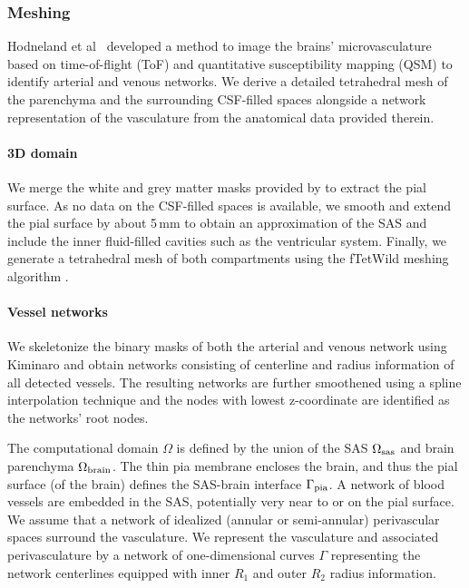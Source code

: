 \documentclass[fleqn,10pt]{wlscirep}
\begin{document}
\subsubsection*{Meshing}

Hodneland et al~\cite{hodneland2019new} developed a method to image the brains' microvasculature based on time-of-flight (ToF) and quantitative susceptibility mapping (QSM) to identify arterial and venous networks.
We derive a detailed tetrahedral mesh of the parenchyma and the surrounding CSF-filled spaces alongside a network representation of the vasculature from the anatomical data provided therein.  

\paragraph{3D domain}

We merge the white and grey matter masks provided by \cite{hodneland2019new} to extract the pial surface. As no data on the CSF-filled spaces is available, we smooth and extend the pial surface by about 5\,mm to obtain an approximation of the SAS and include the inner fluid-filled cavities such as the ventricular system. 
Finally, we generate a tetrahedral mesh of both compartments using the fTetWild meshing algorithm \cite{hu2020fast}.

\paragraph{Vessel networks}

We skeletonize the binary masks of both the arterial and venous network using Kiminaro \cite{william_silversmith_2021_5539913} and obtain networks consisting of centerline and radius information of all detected vessels. The resulting networks are further smoothened using a spline interpolation technique and the nodes with lowest z-coordinate are identified as the networks' root nodes.

The computational domain $\Omega$ is defined by the union of the SAS $\Omega_{\rm sas}$ and brain parenchyma $\Omega_{\rm brain}$. The thin pia membrane encloses the brain, and thus the pial surface (of the brain) defines the SAS-brain interface $\Gamma_{\rm pia}$. A network of blood vessels are embedded in the SAS, potentially very near to or on the pial surface. We assume that a network of idealized (annular or semi-annular) perivascular spaces surround the vasculature. We represent the vasculature and associated perivasculature by a network of one-dimensional curves $\Gamma$ representing the network centerlines equipped with inner $R_1$ and outer $R_2$ radius information. 
\end{document}
